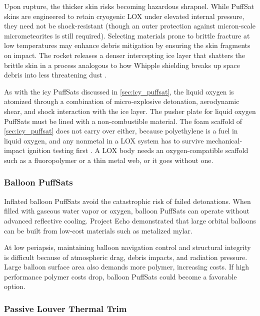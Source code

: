 \documentclass{article}
\begin{document}
Upon rupture, the thicker skin risks becoming hazardous shrapnel. While PuffSat skins are engineered to retain cryogenic LOX under elevated internal pressure, they need not be shock-resistant (though an outer protection against micron-scale micrometeorites is still required). Selecting materials prone to brittle fracture at low temperatures may enhance debris mitigation by ensuring the skin fragments on impact. The rocket releases a denser intercepting ice layer that shatters the brittle skin in a process analogous to how Whipple shielding breaks up space debris into less threatening dust \cite{whipple_shield}.

As with the icy PuffSats discussed in \autoref{sec:icy_puffsat}, the liquid oxygen is atomized through a combination of micro-explosive detonation, aerodynamic shear, and shock interaction with the ice layer.  The pusher plate for liquid oxygen PuffSats must be lined with a non-combustible material. The foam scaffold of \autoref{sec:icy_puffsat} does not carry over either, because polyethylene is a fuel in liquid oxygen, and any nonmetal in a LOX system has to survive mechanical-impact ignition testing first \cite{nasa_oxygen_compatibility}. A LOX body needs an oxygen-compatible scaffold such as a fluoropolymer or a thin metal web, or it goes without one.

\subsubsection{Balloon PuffSats}
Inflated balloon PuffSats avoid the catastrophic risk of failed detonations.  When filled with gaseous water vapor or oxygen, balloon PuffSats can operate without advanced reflective cooling. Project Echo \cite{nasa_echo_ii_1966} demonstrated that large orbital balloons can be built from low-cost materials such as metalized mylar.

At low periapsis, maintaining balloon navigation control and structural integrity is difficult because of  atmospheric drag, debris impacts, and radiation pressure. Large balloon surface area also demands more polymer, increasing costs. If high performance polymer costs drop, balloon PuffSats could become a favorable option.

\subsubsection{Passive Louver Thermal Trim}\label{sec:louver_thermal_trim}
\end{document}
